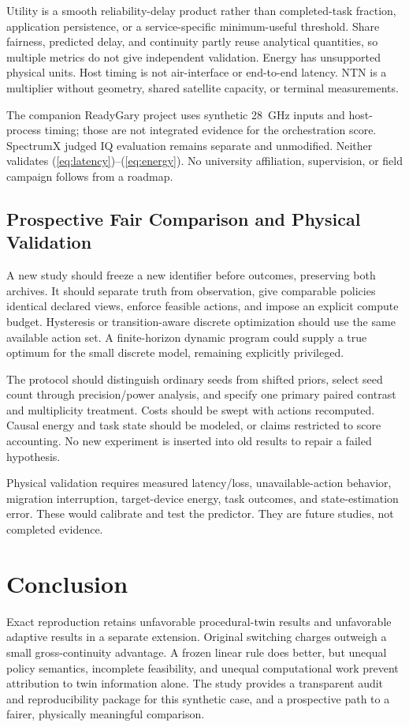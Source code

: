 Utility is a smooth reliability-delay product rather than completed-task fraction, application persistence, or a service-specific minimum-useful threshold. Share fairness, predicted delay, and continuity partly reuse analytical quantities, so multiple metrics do not give independent validation. Energy has unsupported physical units. Host timing is not air-interface or end-to-end latency. NTN is a multiplier without geometry, shared satellite capacity, or terminal measurements.

The companion ReadyGary project uses synthetic 28~GHz inputs and host-process timing; those are not integrated evidence for the orchestration score. SpectrumX judged IQ evaluation remains separate and unmodified. Neither validates (\ref{eq:latency})--(\ref{eq:energy}). No university affiliation, supervision, or field campaign follows from a roadmap.

\subsection{Prospective Fair Comparison and Physical Validation}
A new study should freeze a new identifier before outcomes, preserving both archives. It should separate truth from observation, give comparable policies identical declared views, enforce feasible actions, and impose an explicit compute budget. Hysteresis or transition-aware discrete optimization should use the same available action set. A finite-horizon dynamic program could supply a true optimum for the small discrete model, remaining explicitly privileged.

The protocol should distinguish ordinary seeds from shifted priors, select seed count through precision/power analysis, and specify one primary paired contrast and multiplicity treatment. Costs should be swept with actions recomputed. Causal energy and task state should be modeled, or claims restricted to score accounting. No new experiment is inserted into old results to repair a failed hypothesis.

Physical validation requires measured latency/loss, unavailable-action behavior, migration interruption, target-device energy, task outcomes, and state-estimation error. These would calibrate and test the predictor. They are future studies, not completed evidence.

\section{Conclusion}
Exact reproduction retains unfavorable procedural-twin results and unfavorable adaptive results in a separate extension. Original switching charges outweigh a small gross-continuity advantage. A frozen linear rule does better, but unequal policy semantics, incomplete feasibility, and unequal computational work prevent attribution to twin information alone. The study provides a transparent audit and reproducibility package for this synthetic case, and a prospective path to a fairer, physically meaningful comparison.

